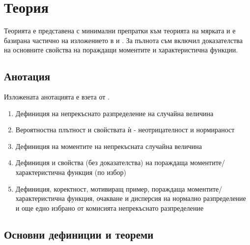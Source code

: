 \documentclass{../../common/topic}
\begin{document}
\maketitle

\section{Теория}

Теорията е представена с минимални препратки към теорията на мярката и е базирана частично на изложението в \cite{Borovkov} и \cite{DimitrovYanev}. За пълнота съм включил доказателства на основните свойства на пораждащи моментите и характеристична функции.

\subsection{Анотация}

Изложената анотацията е взета от \cite{Syllabus}.

\begin{enumerate}
  \item Дефиниция на непрекъснато разпределение на случайна величина
  \item Вероятностна плътност и свойствата ѝ - неотрицателност и нормираност
  \item Дефиниция на моментите на непрекъсната случайна величина
  \item Дефиниция и свойства (без доказателства) на пораждаща моментите/характеристична функция (по избор)
  \item Дефиниция, коректност, мотивиращ пример, пораждаща моментите/характеристична функция, очакване и дисперсия на нормално разпределение и още едно избрано от комисията непрекъснато разпределение
\end{enumerate}

\subsection{Основни дефиниции и теореми}
\end{document}
